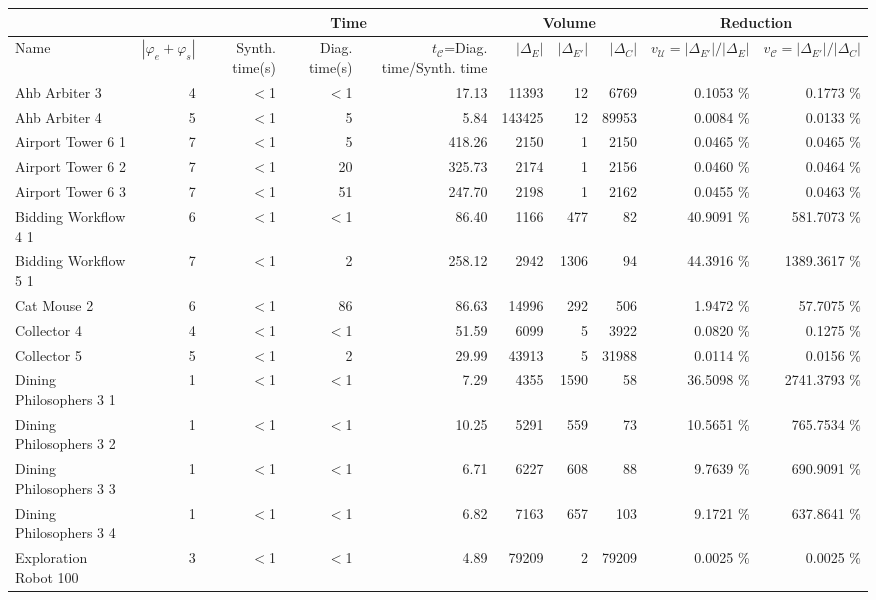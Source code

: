 \begin{tabular}{|l|r|rrr|rrr|rr|}
  \hline & & \multicolumn{3}{c|}{Time}&\multicolumn{3}{c|}{Volume} & \multicolumn{2}{c|}{Reduction}\\ \hline
Name & $|\varphi_e + \varphi_s|$ & Synth. time(s) & Diag. time(s) & $t_{\mathcal{C}}$=Diag. time/Synth. time & $|\Delta_E|$ & $|\Delta_{E'}|$ & $|\Delta_{C}|$ & $v_{\mathcal{U}}=|\Delta_{E'}|/|\Delta_{E}|$ & $v_{\mathcal{C}}=|\Delta_{E'}|/|\Delta_{C}|$ \\ 
  \hline
Ahb Arbiter 3 &   4 & $<$1 & $<$1 & 17.13 & 11393 &  12 & 6769 &  0.1053 \% &    0.1773 \% \\ 
  Ahb Arbiter 4 &   5 & $<$1 & 5 & 5.84 & 143425 &  12 & 89953 &  0.0084 \% &    0.0133 \% \\ 
  Airport Tower 6 1 &   7 & $<$1 & 5 & 418.26 & 2150 &   1 & 2150 &  0.0465 \% &    0.0465 \% \\ 
  Airport Tower 6 2 &   7 & $<$1 & 20 & 325.73 & 2174 &   1 & 2156 &  0.0460 \% &    0.0464 \% \\ 
  Airport Tower 6 3 &   7 & $<$1 & 51 & 247.70 & 2198 &   1 & 2162 &  0.0455 \% &    0.0463 \% \\ 
  Bidding Workflow 4 1 &   6 & $<$1 & $<$1 & 86.40 & 1166 & 477 &  82 & 40.9091 \% &  581.7073 \% \\ 
  Bidding Workflow 5 1 &   7 & $<$1 & 2 & 258.12 & 2942 & 1306 &  94 & 44.3916 \% & 1389.3617 \% \\ 
  Cat Mouse 2 &   6 & $<$1 & 86 & 86.63 & 14996 & 292 & 506 &  1.9472 \% &   57.7075 \% \\ 
  Collector 4 &   4 & $<$1 & $<$1 & 51.59 & 6099 &   5 & 3922 &  0.0820 \% &    0.1275 \% \\ 
  Collector 5 &   5 & $<$1 & 2 & 29.99 & 43913 &   5 & 31988 &  0.0114 \% &    0.0156 \% \\ 
  Dining Philosophers 3 1 &   1 & $<$1 & $<$1 & 7.29 & 4355 & 1590 &  58 & 36.5098 \% & 2741.3793 \% \\ 
  Dining Philosophers 3 2 &   1 & $<$1 & $<$1 & 10.25 & 5291 & 559 &  73 & 10.5651 \% &  765.7534 \% \\ 
  Dining Philosophers 3 3 &   1 & $<$1 & $<$1 & 6.71 & 6227 & 608 &  88 &  9.7639 \% &  690.9091 \% \\ 
  Dining Philosophers 3 4 &   1 & $<$1 & $<$1 & 6.82 & 7163 & 657 & 103 &  9.1721 \% &  637.8641 \% \\ 
  Exploration Robot 100 &   3 & $<$1 & $<$1 & 4.89 & 79209 &   2 & 79209 &  0.0025 \% &    0.0025 \% \\ 

\end{tabular}
